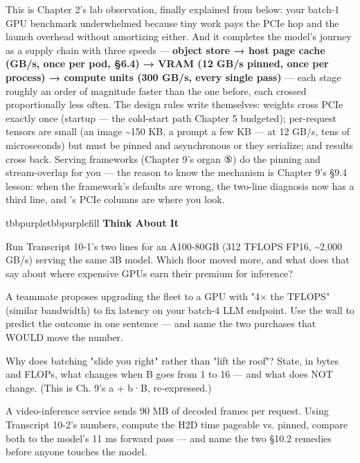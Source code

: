 This is Chapter 2's lab observation, finally explained from below: your batch-1 GPU benchmark underwhelmed because tiny work pays the PCIe hop and the launch overhead without amortizing either. And it completes the model's journey as a supply chain with three speeds — \textbf{object store → host page cache (GB/s, once per pod, §6.4) → VRAM (12 GB/s pinned, once per process) → compute units (300 GB/s, every single pass)} — each stage roughly an order of magnitude faster than the one before, each crossed proportionally less often. The design rules write themselves: weights cross PCIe exactly once (startup — the cold-start path Chapter 5 budgeted); per-request tensors are small (an image \textasciitilde{}150 KB, a prompt a few KB — at 12 GB/s, tens of microseconds) but must be pinned and asynchronous or they serialize; and results cross back. Serving frameworks (Chapter 9's organ ⑤) do the pinning and stream-overlap for you — the reason to know the mechanism is Chapter 9's §9.4 lesson: when the framework's defaults are wrong, the two-line diagnosis now has a third line, and 's PCIe columns are where you look.

\begin{calloutbox}{tbbpurple}{tbbpurplefill}
{\normalsize\bfseries\color{tbbpurple}Think About It}\par\vspace{3pt}
\begin{tbbitemize}
  \item Run Transcript 10-1's two lines for an A100-80GB (312 TFLOPS FP16, \textasciitilde{}2,000 GB/s) serving the same 3B model. Which floor moved more, and what does that say about where expensive GPUs earn their premium for inference?
  \item A teammate proposes upgrading the fleet to a GPU with "4× the TFLOPS" (similar bandwidth) to fix latency on your batch-4 LLM endpoint. Use the wall to predict the outcome in one sentence — and name the two purchases that WOULD move the number.
  \item Why does batching "slide you right" rather than "lift the roof"? State, in bytes and FLOPs, what changes when B goes from 1 to 16 — and what does NOT change. (This is Ch. 9's a + b·B, re-expressed.)
  \item A video-inference service sends 90 MB of decoded frames per request. Using Transcript 10-2's numbers, compute the H2D time pageable vs. pinned, compare both to the model's 11 ms forward pass — and name the two §10.2 remedies before anyone touches the model.
\end{tbbitemize}
\end{calloutbox}

